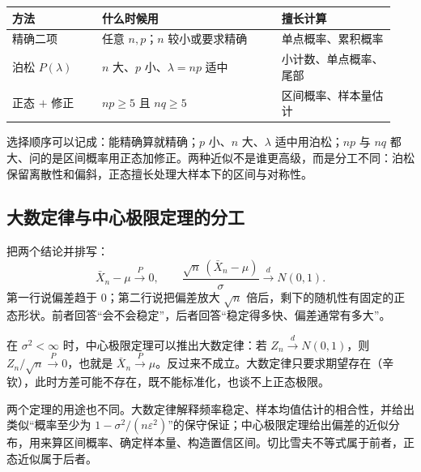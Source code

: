 \begin{center}
\begin{tabular}{@{}p{0.22\linewidth}p{0.44\linewidth}p{0.28\linewidth}@{}}
\toprule
方法 & 什么时候用 & 擅长计算 \\
\midrule
精确二项 & 任意 $n,p$；$n$ 较小或要求精确 & 单点概率、累积概率 \\[4pt]
泊松 $P(\lambda)$ & $n$ 大、$p$ 小、$\lambda=np$ 适中 & 小计数、单点概率、尾部 \\[4pt]
正态 $+$ 修正 & $np\ge5$ 且 $nq\ge5$ & 区间概率、样本量估计 \\
\bottomrule
\end{tabular}
\end{center}

选择顺序可以记成：能精确算就精确；$p$ 小、$n$ 大、$\lambda$ 适中用泊松；$np$ 与 $nq$ 都大、问的是区间概率用正态加修正。两种近似不是谁更高级，而是分工不同：泊松保留离散性和偏斜，正态擅长处理大样本下的区间与对称性。

\subsection{大数定律与中心极限定理的分工}

把两个结论并排写：
\[
\bar X_n-\mu\overset{P}{\longrightarrow}0,
\qquad
\frac{\sqrt n\,(\bar X_n-\mu)}{\sigma}\overset{d}{\longrightarrow}N(0,1).
\]
第一行说偏差趋于 $0$；第二行说把偏差放大 $\sqrt n$ 倍后，剩下的随机性有固定的正态形状。前者回答“会不会稳定”，后者回答“稳定得多快、偏差通常有多大”。

在 $\sigma^2<\infty$ 时，中心极限定理可以推出大数定律：若 $Z_n\overset{d}{\longrightarrow}N(0,1)$，则 $Z_n/\sqrt n\overset{P}{\longrightarrow}0$，也就是 $\bar X_n\overset{P}{\longrightarrow}\mu$。反过来不成立。大数定律只要求期望存在（辛钦），此时方差可能不存在，既不能标准化，也谈不上正态极限。

两个定理的用途也不同。大数定律解释频率稳定、样本均值估计的相合性，并给出类似“概率至少为 $1-\sigma^2/(n\varepsilon^2)$”的保守保证；中心极限定理给出偏差的近似分布，用来算区间概率、确定样本量、构造置信区间。切比雪夫不等式属于前者，正态近似属于后者。

